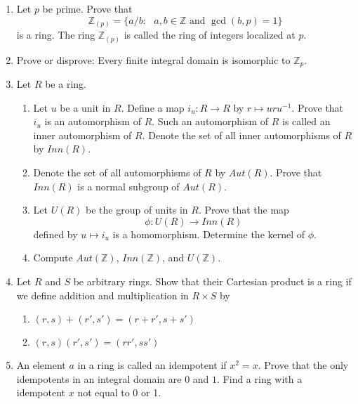 {\begin{enumerate}
 
\item
Let $p$ be prime. Prove that
\[
{\mathbb Z}_{(p)}\label{notelocalint} = \{ a / b :  \mbox{ $a, b \in
{\mathbb Z}$ and $\gcd( b,p) =  1$}  \}  
\]
is a ring.  The ring ${\mathbb Z}_{(p)}$ is called the {\bfi ring of
integers localized at $p$}.  
 
 
\item
Prove or disprove: Every finite integral domain is isomorphic to
${\mathbb Z}_p$. 
 
 
\item
Let $R$ be a ring.
\begin{enumerate}
 
 \item
Let $u$ be a unit in $R$.  Define a map $i_u : R \rightarrow R$ by $r
\mapsto uru^{-1}$. Prove that $i_u$ is an automorphism of $R$. Such an
automorphism of $R$ is called an inner automorphism of $R$. Denote the
set of all inner automorphisms of $R$ by $Inn(R)$.
 
 \item
Denote the set of all automorphisms of $R$ by $Aut(R)$. Prove that
$Inn(R)$ is a normal subgroup of  $Aut(R)$. 
 
 \item
Let $U(R)$ be the group of units in $R$. Prove that the map
\[
\phi : U(R) \rightarrow Inn(R)
\]
defined by $u \mapsto i_u$ is a homomorphism.  Determine the kernel of
$\phi$. 
 
 \item
Compute $Aut( {\mathbb Z})$, $Inn( {\mathbb Z})$,  and $U( {\mathbb Z})$. 
 
\end{enumerate}
 
 
\item
Let $R$ and $S$ be arbitrary rings.  Show that their Cartesian product
is a ring if we define addition and multiplication in $R \times S$  by 
\begin{enumerate}
 
 \item
$(r, s) + (r', s') = ( r + r', s + s')$
 
 \item
$(r, s)(r', s') = ( rr', ss')$
 
\end{enumerate}
 
 
\item
An element $a$ in a ring is called an {\bfi
idempotent\/} if $x^2 = x$.
Prove that the only idempotents in an integral domain are $0$ and $1$. 
Find a ring with a idempotent $x$ not equal to 0 or 1.
 

\end{enumerate}}
